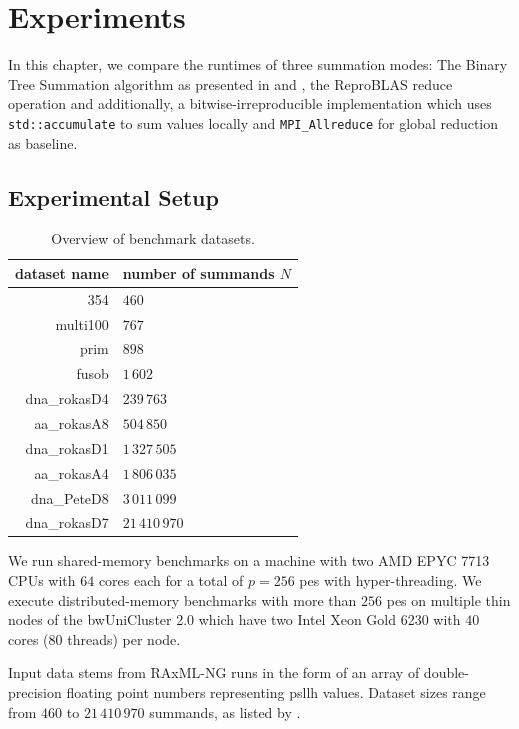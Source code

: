 \chapter{Experiments}
\label{ch:Experiments}

In this chapter, we compare the runtimes of three summation modes:
The Binary Tree Summation algorithm as presented in  and , the ReproBLAS reduce operation and additionally, a bitwise-irreproducible implementation which uses \texttt{std::accumulate} to sum values locally and \texttt{MPI\_Allreduce} for global reduction as baseline.

\section{Experimental Setup}
\label{sec:ExperimentalSetup}

\begin{table}
\centering
\caption{Overview of benchmark datasets.}
\label{table:datasets}
\begin{tabular}{r|l}
\textbf{dataset name} & \textbf{number of summands $N$} \\
\hline
354 & $460$ \\
multi100 & $767$ \\
prim & $898$ \\
fusob & $1\,602$ \\
dna\_rokasD4 & $239\,763$ \\
aa\_rokasA8 & $504\,850$ \\
dna\_rokasD1 & $1\,327\,505$ \\
aa\_rokasA4 & $1\,806\,035$ \\
dna\_PeteD8 & $3\,011\,099$ \\
dna\_rokasD7 & $21\,410\,970$ \\
\end{tabular}
\end{table}

We run shared-memory benchmarks on a machine with two AMD EPYC 7713 CPUs with $64$ cores each for a total of $p=256$ \glspl{pe} with hyper-threading.
We execute distributed-memory benchmarks with more than $256$ \glspl{pe} on multiple thin nodes of the bwUniCluster 2.0 which have two Intel Xeon Gold 6230  with $40$ cores ($80$ threads) per node.

Input data stems from RAxML-NG runs in the form of an array of double-precision floating point numbers representing \gls{psllh} values.
Dataset sizes range from $460$ to $21\,410\,970$ summands, as listed by .

